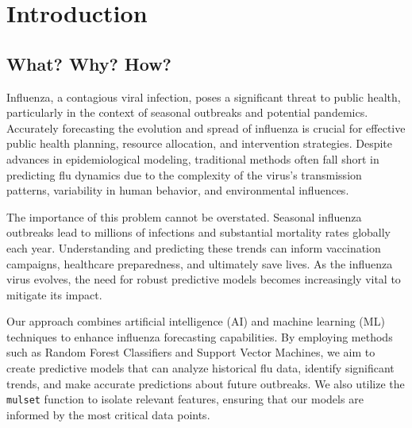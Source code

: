 \documentclass[runningheads,a4paper,11pt]{report}
\begin{document}
\tableofcontents

\newpage

\listoftables
\listoffigures
\listofalgorithms

\newpage




\newpage



 


\chapter{Introduction}
\label{chapter:introduction}

\section{What? Why? How?}
\label{section:what}

Influenza, a contagious viral infection, poses a significant threat to public health, particularly in the context of seasonal outbreaks and potential pandemics. Accurately forecasting the evolution and spread of influenza is crucial for effective public health planning, resource allocation, and intervention strategies. Despite advances in epidemiological modeling, traditional methods often fall short in predicting flu dynamics due to the complexity of the virus's transmission patterns, variability in human behavior, and environmental influences.

The importance of this problem cannot be overstated. Seasonal influenza outbreaks lead to millions of infections and substantial mortality rates globally each year. Understanding and predicting these trends can inform vaccination campaigns, healthcare preparedness, and ultimately save lives. As the influenza virus evolves, the need for robust predictive models becomes increasingly vital to mitigate its impact.

Our approach combines artificial intelligence (AI) and machine learning (ML) techniques to enhance influenza forecasting capabilities. By employing methods such as Random Forest Classifiers and Support Vector Machines, we aim to create predictive models that can analyze historical flu data, identify significant trends, and make accurate predictions about future outbreaks. We also utilize the \verb|mulset| function to isolate relevant features, ensuring that our models are informed by the most critical data points.
\end{document}

